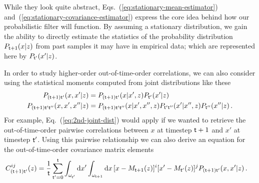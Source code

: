 While they look quite abstract, Eqs.~(\ref{eq:stationary-mean-estimator}) and~(\ref{eq:stationary-covariance-estimator}) express the core idea behind how our probabilistic filter will function. By assuming a stationary distribution, we gain the ability to directly estimate the statistics of the probability distribution $P_{{\sf t}+1}(x\vert z)$ from past samples it may have in empirical data; which are represented here by $P_{{\sf t}'}(x'\vert z)$.

In order to study higher-order out-of-time-order correlations, we can also consider using the statistical moments computed from joint distributions like these
\begin{align}
P_{({\sf t}+1){\sf t}'}(x, x'\vert z) &= P_{({\sf t}+1){\sf t}'}(x\vert x',z)P_{{\sf t}'}(x'\vert z) \label{eq:2nd-joint-dist}\\
P_{({\sf t}+1){\sf t}'{\sf t}''}(x, x', x''\vert z) &= P_{({\sf t}+1){\sf t}'{\sf t}''}(x\vert x', x'', z)P_{{\sf t}'{\sf t}''}(x'\vert x'', z)P_{{\sf t}''}(x''\vert z) \label{eq:3rd-joint-dist}\,.
\end{align}
For example, Eq.~(\ref{eq:2nd-joint-dist}) would apply if we wanted to retrieve the out-of-time-order pairwise correlations between $x$ at timestep ${\sf t}+1$ and $x'$ at timestep ${\sf t}'$. Using this pairwise relationship we can also derive an equation for the out-of-time-order covariance matrix elements
\begin{align}
C_{({\sf t}+1){\sf t}'}^{ij}(z) &= \frac{1}{{\sf t}}\sum_{{\sf t}'=0}^{{\sf t}}\int_{\omega_{{\sf t}'}}{\rm d}x'\int_{\omega_{{\sf t}+1}}{\rm d}x \,[x-M_{{\sf t}+1}(z)]^i[x'-M_{{\sf t}'}(z)]^j P_{({\sf t}+1){\sf t}'}(x, x'\vert z) \label{eq:out-of-time-order-covariance-estimator} \,.
\end{align}

